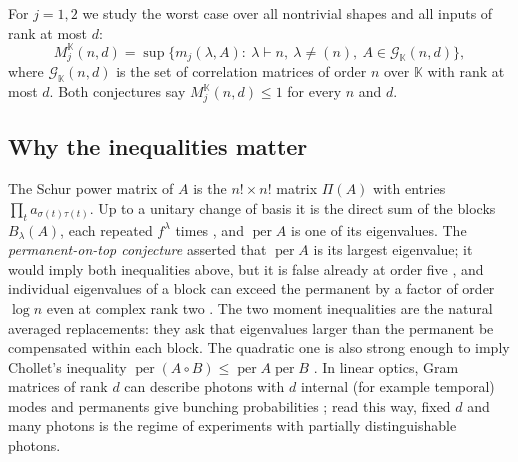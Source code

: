 \documentclass[11pt,a4paper]{article}
\theoremstyle{remark}
\newcommand{\per}{\operatorname{per}}
\newcommand{\K}{\mathbb K}
\begin{document}
For $j=1,2$ we study the worst case over all nontrivial shapes and all inputs of rank at most $d$:
\[
 M_j^{\K}(n,d)=\sup\bigl\{m_j(\lambda,A):\ \lambda\vdash n,\ \lambda\ne(n),\ A\in\mathcal G_\K(n,d)\bigr\},
\]
where $\mathcal G_\K(n,d)$ is the set of correlation matrices of order $n$ over $\K$ with rank at most $d$.
Both conjectures say $M_j^\K(n,d)\le1$ for every $n$ and $d$.

\subsection{Why the inequalities matter}
The Schur power matrix of $A$ is the $n!\times n!$ matrix $\Pi(A)$ with entries $\prod_ta_{\sigma(t)\tau(t)}$. Up to a unitary change of basis it is the direct sum of the blocks $B_\lambda(A)$, each repeated $f^\lambda$ times \cite[Lemma~2.2]{Lavi}, and $\per A$ is one of its eigenvalues. The \emph{permanent-on-top conjecture} asserted that $\per A$ is its largest eigenvalue; it would imply both inequalities above, but it is false already at order five \cite{Shchesnovich}, and individual eigenvalues of a block can exceed the permanent by a factor of order $\log n$ even at complex rank two \cite{EPBS}. The two moment inequalities are the natural averaged replacements: they ask that eigenvalues larger than the permanent be compensated within each block. The quadratic one is also strong enough to imply Chollet's inequality $\per(A\circ B)\le\per A\per B$ \cite[Theorem~2.1]{Lavi}. In linear optics, Gram matrices of rank $d$ can describe photons with $d$ internal (for example temporal) modes and permanents give bunching probabilities \cite{EPBS}; read this way, fixed $d$ and many photons is the regime of experiments with partially distinguishable photons.
\end{document}
